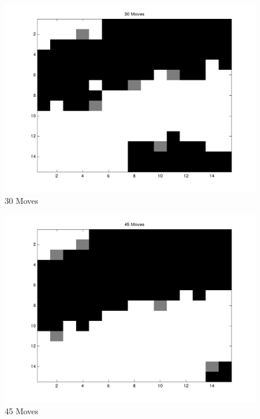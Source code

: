 \begin{figure}[htbp]
	\begin{center}
		\includegraphics[width=12cm]{Plot/Q3/PS1_Q3_30Move.png}
		\caption{30 Moves}
	\end{center}
\end{figure}	

\begin{figure}[htbp]
	\begin{center}
		\includegraphics[width=12cm]{Plot/Q3/PS1_Q3_45Move.png}
		\caption{45 Moves}
		\label{45move}
	\end{center}
\end{figure}
